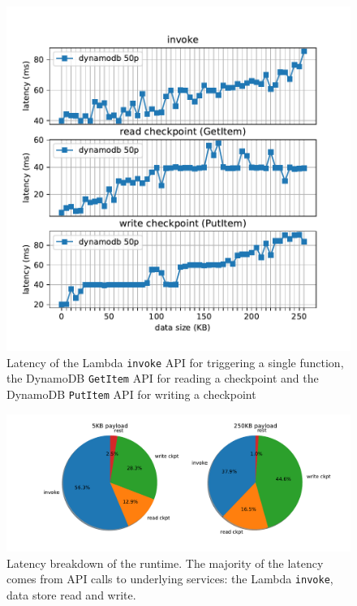 \begin{figure}[t!]
    \centering
    \includegraphics[width=\columnwidth]{figures/OpLatency.pdf}
    \caption{Latency of the Lambda \texttt{invoke} API for triggering a single
    function, the DynamoDB \texttt{GetItem} API for reading a checkpoint and
    the DynamoDB \texttt{PutItem} API for writing a checkpoint}
    \label{fig:oplatency}
\end{figure}

\begin{figure}[t!]
    \centering
    \includegraphics[width=\columnwidth]{figures/OpLatency-pct.pdf}
    \caption{Latency breakdown of the \name{} runtime. The majority of the
    latency comes from API calls to underlying services: the Lambda
    \texttt{invoke}, data store read and write.}
    \label{fig:oplatency-pct}
\end{figure}


